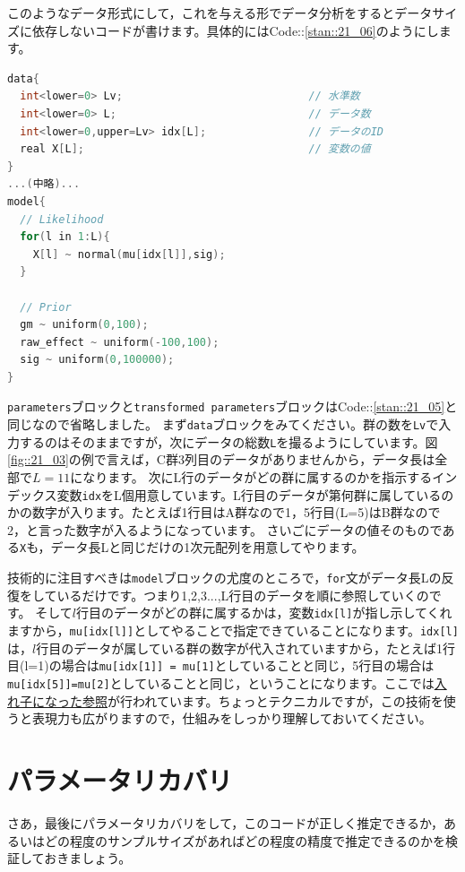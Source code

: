 \documentclass{ltjsbook}
\begin{document}
このようなデータ形式にして，これを与える形でデータ分析をするとデータサイズに依存しないコードが書けます。具体的にはCode::\ref{stan::21_06}のようにします。
\begin{lstlisting}[language=C++,label={stan::21_06},caption={整然データに対応したコード}]
data{
  int<lower=0> Lv;                             // 水準数
  int<lower=0> L;                              // データ数
  int<lower=0,upper=Lv> idx[L];                // データのID
  real X[L];                                   // 変数の値
}
...(中略)...
model{
  // Likelihood
  for(l in 1:L){
    X[l] ~ normal(mu[idx[l]],sig);
  }
    
  // Prior
  gm ~ uniform(0,100);
  raw_effect ~ uniform(-100,100);
  sig ~ uniform(0,100000);
}
\end{lstlisting}

\verb|parameters|ブロックと\verb|transformed parameters|ブロックはCode::\ref{stan::21_05}と同じなので省略しました。
まず\verb|data|ブロックをみてください。群の数を\verb|Lv|で入力するのはそのままですが，次にデータの総数\verb|L|を撮るようにしています。図\ref{fig::21_03}の例で言えば，C群3列目のデータがありませんから，データ長は全部で$L=11$になります。
次にL行のデータがどの群に属するのかを指示するインデックス変数\verb|idx|をL個用意しています。L行目のデータが第何群に属しているのかの数字が入ります。たとえば1行目はA群なので1，5行目(L=5)はB群なので2，と言った数字が入るようになっています。
さいごにデータの値そのものである\verb|X|も，データ長Lと同じだけの1次元配列を用意してやります。

技術的に注目すべきは\verb|model|ブロックの尤度のところで，\verb|for|文がデータ長Lの反復をしているだけです。つまり1,2,3...,L行目のデータを順に参照していくのです。
そして$l$行目のデータがどの群に属するかは，変数\verb|idx[l]|が指し示してくれますから，\verb|mu[idx[l]]|としてやることで指定できていることになります。\verb|idx[l]|は，$l$行目のデータが属している群の数字が代入されていますから，たとえば1行目(l=1)の場合は\verb|mu[idx[1]] = mu[1]|としていることと同じ，5行目の場合は\verb|mu[idx[5]]=mu[2]|としていることと同じ，ということになります。ここでは\underline{入れ子になった参照}が行われています。ちょっとテクニカルですが，この技術を使うと表現力も広がりますので，仕組みをしっかり理解しておいてください。

\section{パラメータリカバリ}
さあ，最後にパラメータリカバリをして，このコードが正しく推定できるか，あるいはどの程度のサンプルサイズがあればどの程度の精度で推定できるのかを検証しておきましょう。
\end{document}
